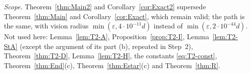\begin{remark}
\emph{Scope.} Theorem~\ref{thm:Main2} and Corollary~\ref{cor:Exact2} supersede Theorem~\ref{thm:Main} and Corollary~\ref{cor:Exact},
which remain valid; the path is the same, with vision radius $\min(\varepsilon,4\cdot10^{-11}d)$ instead of
$\min(\varepsilon,2\cdot10^{-44}d)$. Not used here: Lemma~\ref{lem:T2-A}, Proposition~\ref{prop:T2-I}, Lemma~\ref{lem:T2-StA} (except
the argument of its part (b), repeated in Step~2), Theorem~\ref{thm:T2-D}, Lemma~\ref{lem:T2-H}, the constants \eqref{eq:T2-const},
Theorem~\ref{thm:End}(c), Theorem~\ref{thm:Estar}(c) and Theorem~\ref{thm:R}.
\end{remark}

